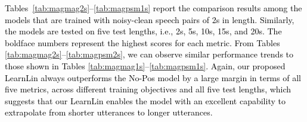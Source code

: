 \documentclass[journal]{IEEEtran}
\begin{document}


\textcolor{black}{Tables~\ref{tab:magmag2s}--\ref{tab:magpsm1s} report the comparison results among the models that are trained with noisy-clean speech pairs of 2s in length. Similarly, the models are tested on five test lengths, i.e., 2s, 5s, 10s, 15s, and 20s. The boldface numbers represent the highest scores for each metric. From Tables \ref{tab:magmag2s}--\ref{tab:magpsm2s}, we can observe similar performance trends to those shown in Tables \ref{tab:magmag1s}--\ref{tab:magpsm1s}. Again, our proposed LearnLin always outperforms the No-Pos model by a large margin in terms of all five metrics, across different training objectives and all five test lengths, which suggests that our LearnLin enables the model with an excellent capability to extrapolate from shorter utterances to longer utterances.} 
\end{document}
